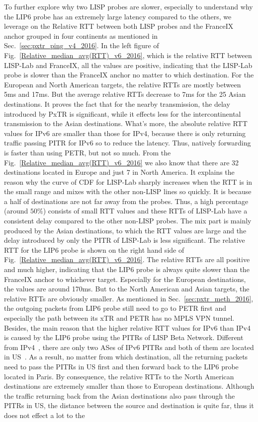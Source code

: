To further explore why two LISP probes are slower, especially to understand why the LIP6 probe has an extremely large latency compared to the others, we leverage on the Relative RTT between both LISP probes and the FranceIX anchor grouped in four continents as mentioned in Sec.~\ref{sec:pxtr_ping_v4_2016}. In the left figure of Fig.~\ref{Relative_median_avg(RTT)_v6_2016}, which is the relative RTT between LISP-Lab and FranceIX, all the values are positive, indicating that the LISP-Lab probe is slower than the FranceIX anchor no matter to which destination. For the European and North American targets, the relative RTTs are mostly between 5ms and 17ms. But the average relative RTTs decrease to 7ms for the 25 Asian destinations. It proves the fact that for the nearby transmission, the delay introduced by PxTR is significant, while it effects less for the intercontinental transmission to the Asian destinations. What's more, the absolute relative RTT values for IPv6 are smaller than those for IPv4, because there is only returning traffic passing PITR for IPv6 so to reduce the latency. Thus, natively forwarding is faster than using PETR, but not so much. From the Fig.~\ref{Relative_median_avg(RTT)_v6_2016} we also know that there are 32 destinations located in Europe and just 7 in North America. It explains the reason why the curve of CDF for LISP-Lab sharply increases when the RTT is in the small range and mixes with the other non-LISP lines so quickly. It is because a half of destinations are not far away from the probes. Thus, a high percentage (around $50\%$) consists of small RTT values and these RTTs of LISP-Lab have a consistent delay compared to the other non-LISP probes. The mix part is mainly produced by the Asian destinations, to which the RTT values are large and the delay introduced by only the PITR of LISP-Lab is less significant. The relative RTT for the LIP6 probe is shown on the right hand side of Fig.~\ref{Relative_median_avg(RTT)_v6_2016}. The relative RTTs are all positive and much higher, indicating that the LIP6 probe is always quite slower than the FranceIX anchor to whichever target. Especially for the European destinations, the values are around 170ms. But to the North American and Asian targets, the relative RTTs are obviously smaller. As mentioned in Sec.~\ref{sec:pxtr_meth_2016}, the outgoing packets from LIP6 probe still need to go to PETR first and especially the path between its xTR and PETR has no MPLS VPN tunnel. Besides, the main reason that the higher relative RTT values for IPv6 than IPv4 is caused by the LIP6 probe using the PITRs of LISP Beta Network. Different from IPv4~\cite{bgpv4}, there are only two ASes of IPv6 PITRs and both of them are located in US~\cite{bgpv6}. As a result, no matter from which destination, all the returning packets need to pass the PITRs in US first and then forward back to the LIP6 probe located in Paris. By consequence, the relative RTTs to the North American destinations are extremely smaller than those to European destinations. Although the traffic returning back from the Asian destinations also pass through the PITRs in US, the distance between the source and destination is quite far, thus it does not effect a lot to the 